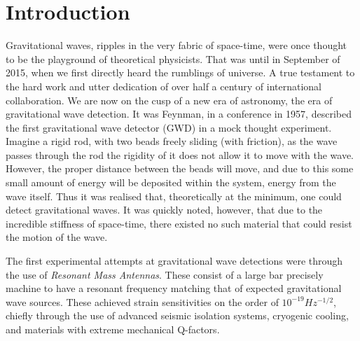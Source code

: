 \documentclass[aps,  
                a4paper, 
                amsmath, 
                amssymb, 
                preprint,
                tightenlines,  
                amsfonts,
                nofootinbib,
                onecolumn,
                titlepage,
                10pt
            ]{revtex4-2}
\begin{document}
\tableofcontents

\section{Introduction}
    \par
    Gravitational waves, ripples in the very fabric of space-time, were once thought to be the playground of theoretical physicists. That was until in September of 2015, when we first directly heard the rumblings of universe\cite{abbott2016}. A true testament to the hard work and utter dedication of over half a century of international collaboration. We are now on the cusp of a new era of astronomy, the era of gravitational wave detection. It was Feynman\cite{preskillnodate}, in a conference in 1957, described the first gravitational wave detector (GWD) in a mock thought experiment. Imagine a rigid rod, with two beads freely sliding (with friction), as the wave passes through the rod the rigidity of it does not allow it to move with the wave. However, the proper distance between the beads will move, and due to this some small amount of energy will be deposited within the system, energy from the wave itself. Thus it was realised that, theoretically at the minimum, one could detect gravitational waves. It was quickly noted, however, that due to the incredible stiffness of space-time, there existed no such material that could resist the motion of the wave.
    \par
    The first experimental attempts at gravitational wave detections were through the use of \textit{Resonant Mass Antennas}. These consist of a large bar precisely machine to have a resonant frequency matching that of expected gravitational wave sources. These achieved strain sensitivities on the order of $10^{-19}Hz^{-1/2}$, chiefly through the use of advanced seismic isolation systems, cryogenic cooling, and materials with extreme mechanical Q-factors.
\end{document}
